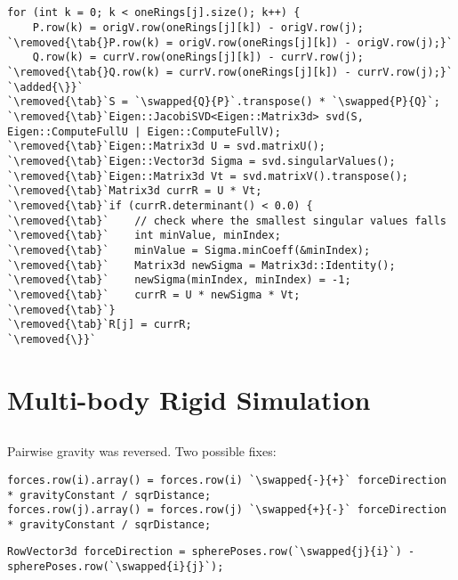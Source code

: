 \documentclass[12pt, a4paper]{article}
\newcommand{\removed}[1]{\colorbox{pink}{\vphantom{A}#1}}
\newcommand{\added}[1]{\colorbox{lime}{\vphantom{A}#1}}
\newcommand{\swapped}[2]{\removed{#1}\added{#2}}
\newcommand{\inline}[1]{\fbox{\texttt{#1}}}
\newcommand{\tab}[0]{\space\space\space\space}
\begin{document}
    \subsection{}
        \begin{lstlisting}[caption={Lines 3 and 5 have been removed. The \inline{for} loop is now closed 
            on line 6 instead of 22. \inline{P} and \inline{Q} on line 7 have been wapped. Lines 7 to 21
            are no longer indented.}, label={lst:c1}]
for (int k = 0; k < oneRings[j].size(); k++) {
    P.row(k) = origV.row(oneRings[j][k]) - origV.row(j);
`\removed{\tab{}P.row(k) = origV.row(oneRings[j][k]) - origV.row(j);}`
    Q.row(k) = currV.row(oneRings[j][k]) - currV.row(j);
`\removed{\tab{}Q.row(k) = currV.row(oneRings[j][k]) - currV.row(j);}`
`\added{\}}`
`\removed{\tab}`S = `\swapped{Q}{P}`.transpose() * `\swapped{P}{Q}`;
`\removed{\tab}`Eigen::JacobiSVD<Eigen::Matrix3d> svd(S, Eigen::ComputeFullU | Eigen::ComputeFullV);
`\removed{\tab}`Eigen::Matrix3d U = svd.matrixU();
`\removed{\tab}`Eigen::Vector3d Sigma = svd.singularValues();
`\removed{\tab}`Eigen::Matrix3d Vt = svd.matrixV().transpose();
`\removed{\tab}`Matrix3d currR = U * Vt;
`\removed{\tab}`if (currR.determinant() < 0.0) {
`\removed{\tab}`    // check where the smallest singular values falls
`\removed{\tab}`    int minValue, minIndex;
`\removed{\tab}`    minValue = Sigma.minCoeff(&minIndex);
`\removed{\tab}`    Matrix3d newSigma = Matrix3d::Identity();
`\removed{\tab}`    newSigma(minIndex, minIndex) = -1;
`\removed{\tab}`    currR = U * newSigma * Vt;
`\removed{\tab}`}
`\removed{\tab}`R[j] = currR;
`\removed{\}}`
            \end{lstlisting}

\section{Multi-body Rigid Simulation}
    \subsection{}
        Pairwise gravity was reversed.
        Two possible fixes:
        \begin{lstlisting}[caption={The \inline{+} and \inline{-} have been swapped.}, label={lst:d1}]
forces.row(i).array() = forces.row(i) `\swapped{-}{+}` forceDirection * gravityConstant / sqrDistance;
forces.row(j).array() = forces.row(j) `\swapped{+}{-}` forceDirection * gravityConstant / sqrDistance;
\end{lstlisting}
        \begin{lstlisting}[caption={The \inline{i} and \inline{j} have been swapped.}, label={lst:e1}]
RowVector3d forceDirection = spherePoses.row(`\swapped{j}{i}`) - spherePoses.row(`\swapped{i}{j}`);
\end{lstlisting}
\end{document}
